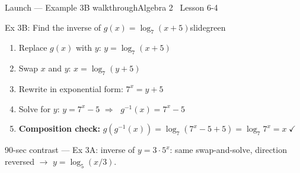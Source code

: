 \documentclass[aspectratio=169, 11pt]{beamer}
\begin{document}
\begin{frame}{Launch --- Example 3B walkthrough}{Algebra 2 \textperiodcentered\ Lesson 6-4}
\vspace{0.2cm}
\begin{projcard}{Ex 3B: Find the inverse of \(g(x) = \log_7(x+5)\)}{slidegreen}
\small
\begin{enumerate}
  \setlength{\itemsep}{2pt}
  \item Replace \(g(x)\) with \(y\): \quad \(y = \log_7(x+5)\)
  \item Swap \(x\) and \(y\): \quad \(x = \log_7(y+5)\)
  \item Rewrite in exponential form: \quad \(7^x = y+5\)
  \item Solve for \(y\): \quad \(y = 7^x - 5\) \quad\(\Rightarrow\;\) \(g^{-1}(x) = 7^x - 5\)
  \item \textbf{Composition check:} \(g(g^{-1}(x)) = \log_7(7^x - 5 + 5) = \log_7 7^x = x\;\checkmark\)
\end{enumerate}
\vspace{3pt}
\textcolor{slidegray}{\small 90-sec contrast --- Ex 3A: inverse of \(y = 3\cdot 5^x\): same swap-and-solve, direction reversed \(\rightarrow\) \(y = \log_5(x/3)\).}
\end{projcard}
\end{frame}
\end{document}
